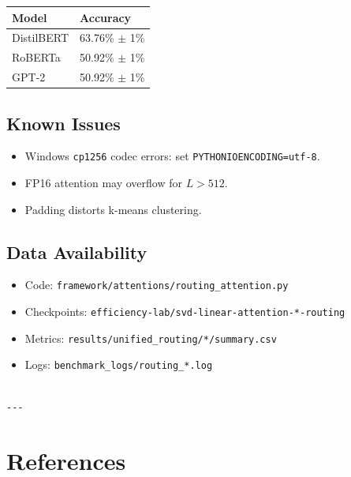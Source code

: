 \begin{table}[H]
\centering
\small
\begin{tabular}{ll}
\toprule
\textbf{Model} & \textbf{Accuracy} \\
\midrule
DistilBERT & 63.76\% $\pm$ 1\% \\
RoBERTa & 50.92\% $\pm$ 1\% \\
GPT-2 & 50.92\% $\pm$ 1\% \\
\bottomrule
\end{tabular}
\end{table}

\subsection{Known Issues}

\begin{itemize}
\item Windows \texttt{cp1256} codec errors: set \texttt{PYTHONIOENCODING=utf-8}.
\item FP16 attention may overflow for $L > 512$.
\item Padding distorts k-means clustering.

\end{itemize}
\subsection{Data Availability}

\begin{itemize}
\item Code: \texttt{framework/attentions/routing\_attention.py}
\item Checkpoints: \texttt{efficiency-lab/svd-linear-attention-*-routing}
\item Metrics: \texttt{results/unified\_routing/*/summary.csv}
\item Logs: \texttt{benchmark\_logs/routing\_*.log}
\end{itemize}
\begin{lstlisting}

---
\end{lstlisting}


\section{References}

